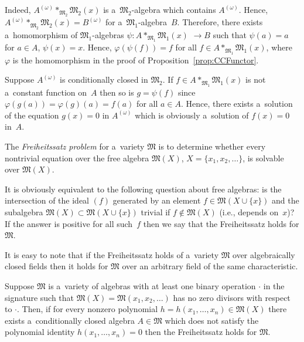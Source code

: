 Indeed, $A^{(\omega)}*_{\mathfrak M_2} \mathfrak M_2(x)$ is a~$\mathfrak M_2$-algebra which contains $A^{(\omega)}$.
Hence, $A^{(\omega)}*_{\mathfrak M_2} \mathfrak M_2(x) = B^{(\omega)}$ for a~$\mathfrak M_1$-algebra~$B$.
Therefore, there exists a~homomorphism of $\mathfrak M_1$-algebras  $\psi: A*_{\mathfrak M_1} \mathfrak M_1(x) $ $\to B $
such that $\psi(a)=a$ for $a\in A$, $\psi(x)=x$.
Hence, $\varphi(\psi(f)) = f $ for all $f\in A*_{\mathfrak M_1} \mathfrak M_1(x)$, where~$\varphi $ is the homomorphism
in the proof of Proposition~\ref{prop:CCFunctor}.

Suppose $A^{(\omega)}$ is conditionally closed in $\mathfrak M_2$.
If $f \in A*_{\mathfrak M_1} \mathfrak M_1(x)$ is not a~constant function on~$A$ then so is $g =\psi(f)$ since
$\varphi(g(a)) = \varphi(g)(a) = f(a)$ for all $a\in A$.
Hence, there exists a~solution of the equation $g(x)=0$ in $A^{(\omega)}$ which is obviously a~solution of $f(x)=0$
in~$A$.

The {\em Freiheitssatz problem} for a~variety $\mathfrak M$ is to determine whether every nontrivial equation over the
free algebra $\mathfrak M(X)$, $X=\{x_1,x_2,\dots \}$, is solvable over $\mathfrak M(X)$.

It is obviously equivalent to the following question about free algebras: is the intersection of the ideal $(f)$
generated by an element $f\in \mathfrak M(X\cup \{x\})$ and the subalgebra $\mathfrak M(X)\subset \mathfrak M(X\cup
\{x\})$ trivial if $f \notin \mathfrak M(X)$ (i.e., depends on~$x$)? If the answer is positive for all such~$f$ then we
say that the Freiheitssatz holds for $\mathfrak M$.

It is easy to note that if the Freiheitssatz holds of a~variety $\mathfrak M$ over algebraically closed f\/ields then it
holds for $\mathfrak M$ over an arbitrary f\/ield of the same characteristic.

\begin{lemma}
\label{lem:CC-Frei}
Suppose $\mathfrak M$ is a~variety of algebras with at least one binary operation $\cdot $ in the signature such that
$\mathfrak M(X)=\mathfrak M(x_1,x_2,\dots)$ has no zero divisors with respect to $\cdot $.
Then, if for every nonzero polynomial $h=h(x_1,\dots, x_n)\in \mathfrak M(X)$ there exists a~conditionally closed
algebra $A\in \mathfrak M$ which does not satisfy the polynomial identity $h(x_1,\dots, x_n) = 0$ then the Freiheitssatz
holds for $\mathfrak M$.
\end{lemma}

